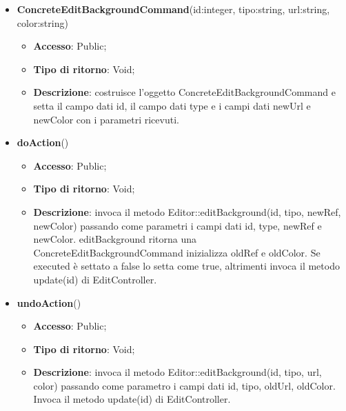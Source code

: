 {{{	
	\begin{itemize}
		\item \textbf{ConcreteEditBackgroundCommand}(id:integer, tipo:string, url:string, color:string)
		\begin{itemize}
			\item \textbf{Accesso}: Public;
			\item \textbf{Tipo di ritorno}: Void;
			\item \textbf{Descrizione}: costruisce l’oggetto ConcreteEditBackgroundCommand e setta il campo dati id, il campo dati type e i campi dati newUrl e newColor con i parametri ricevuti.
		\end{itemize}
		\item \textbf{doAction}()
		\begin{itemize}
			\item \textbf{Accesso}: Public;
			\item \textbf{Tipo di ritorno}: Void;
			\item \textbf{Descrizione}: invoca il metodo Editor::editBackground(id, tipo, newRef, newColor) passando come parametri i campi dati id, type, newRef e newColor. editBackground ritorna una ConcreteEditBackgroundCommand inizializza oldRef e oldColor. Se executed è settato a false lo setta come true, altrimenti invoca il metodo update(id) di EditController.
		\end{itemize}
		\item \textbf{undoAction}()
		\begin{itemize}
			\item \textbf{Accesso}: Public;
			\item \textbf{Tipo di ritorno}: Void;
			\item \textbf{Descrizione}: invoca il metodo Editor::editBackground(id, tipo, url, color) passando come parametro i campi dati id, tipo, oldUrl, oldColor. Invoca il metodo update(id) di EditController.
		\end{itemize}
	\end{itemize}
	}
}}
